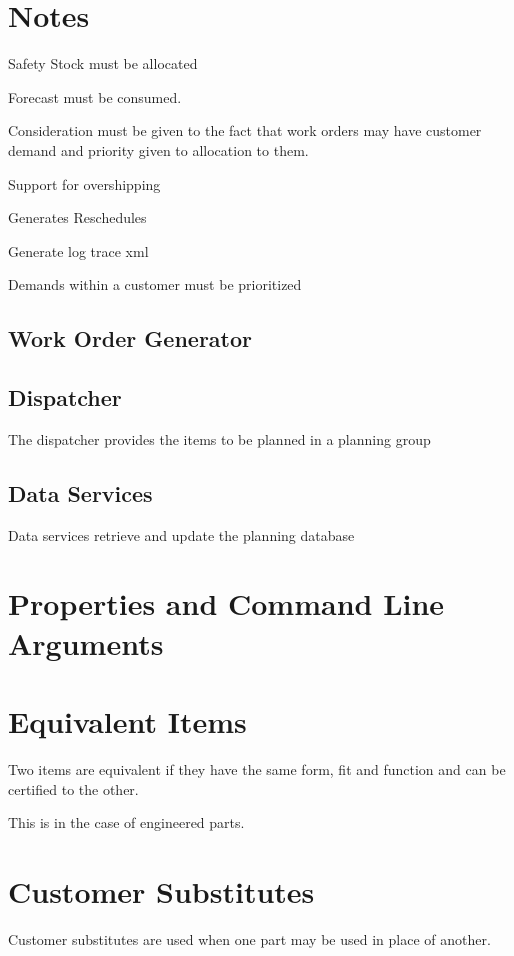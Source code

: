 \documentclass[letterpaper,10pt,english]{sphinxmanual}
\begin{document}
\section{Notes}
\label{APS/ApsTechnical:notes}
Safety Stock must be allocated

Forecast must be consumed.

Consideration must be given to the fact that work orders may have
customer demand and priority given to allocation to them.

Support for overshipping

Generates Reschedules

Generate log trace xml

Demands within a customer must be prioritized


\subsection{Work Order Generator}
\label{APS/ApsTechnical:work-order-generator}

\subsection{Dispatcher}
\label{APS/ApsTechnical:dispatcher}
The dispatcher provides the items to be planned in a planning group


\subsection{Data Services}
\label{APS/ApsTechnical:data-services}
Data services retrieve and update the planning database


\section{Properties and Command Line Arguments}
\label{APS/ApsTechnical:properties-and-command-line-arguments}

\section{Equivalent Items}
\label{APS/ApsTechnical:equivalent-items}
Two items are equivalent if they have the same form, fit and function and can be certified
to the other.

This is in the case of engineered parts.


\section{Customer Substitutes}
\label{APS/ApsTechnical:customer-substitutes}
Customer substitutes are used when one part may be used in place of another.
\end{document}
